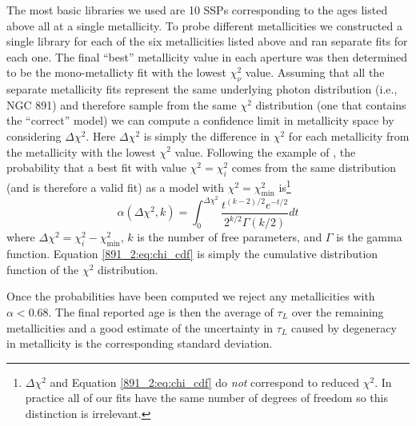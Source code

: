 The most basic libraries we used are 10 SSPs corresponding to the ages
listed above all at a single metallicity. To probe different
metallicities we constructed a single library for each of the six
metallicities listed above and ran separate fits for each one. The
final ``best'' metallicity value in each aperture was then determined
to be the mono-metallicty fit with the lowest $\chi^2_\nu$ value.
Assuming that all the separate metallicity fits represent the same
underlying photon distribution (i.e., NGC 891) and therefore sample
from the same $\chi^2$ distribution (one that contains the ``correct''
model) we can compute a confidence limit in metallicity space by
considering $\Delta\chi^2$. Here $\Delta\chi^2$ is simply the
difference in $\chi^2$ for each metallicity from the metallicity with
the lowest $\chi^2$ value. Following the example of \citet{Wall03},
the probability that a best fit with value $\chi^2 = \chi^2_i$ comes
from the same distribution (and is therefore a valid fit) as a model
with $\chi^2 = \chi^2_{\mathrm{min}}$ is\footnote{$\Delta\chi^2$ and
  Equation \ref{891_2:eq:chi_cdf} do \emph{not} correspond to reduced
  $\chi^2$. In practice all of our fits have the same number of
  degrees of freedom so this distinction is irrelevant.}
\begin{equation}
\label{891_2:eq:chi_cdf}
\alpha(\Delta\chi^2,k) = \int_0^{\Delta\chi^2}\frac{t^{(k-2)/2}e^{-t/2}}{2^{k/2}\Gamma (k/2)}dt
\end{equation}
where $\Delta\chi^2 = \chi^2_i - \chi^2_{\mathrm{min}}$, $k$ is the number of
free parameters, and $\Gamma$ is the gamma function. Equation \ref{891_2:eq:chi_cdf}
is simply the cumulative distribution function of the $\chi^2$ distribution.

Once the probabilities have been computed we reject any metallicities
with $\alpha < 0.68$. The final reported age is then the average of
$\tau_L$ over the remaining metallicities and a good estimate of the
uncertainty in $\tau_L$ caused by degeneracy in metallicity is the
corresponding standard deviation. 



